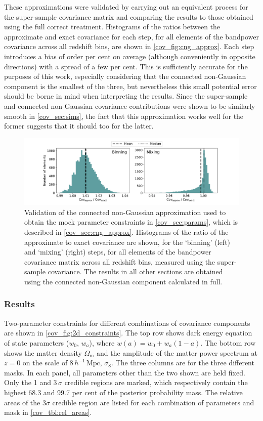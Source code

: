 These approximations were validated by carrying out an equivalent process for the super-sample covariance matrix and comparing the results to those obtained using the full correct treatment.
Histograms of the ratios between the approximate and exact covariance for each step, for all elements of the bandpower covariance across all redshift bins, are shown in \autoref{cov_fig:cng_approx}.
Each step introduces a bias of order per cent on average (although conveniently in opposite directions) with a spread of a few per cent.
This is sufficiently accurate for the purposes of this work, especially considering that the connected non-Gaussian component is the smallest of the three, but nevertheless this small potential error should be borne in mind when interpreting the results. Since the super-sample and connected non-Gaussian covariance contributions were shown to be similarly smooth in \autoref{cov_sec:sims}, the fact that this approximation works well for the former suggests that it should too for the latter.

\begin{figure}
\includegraphics[width=\textwidth]{cng_approx}
\caption{Validation of the connected non-Gaussian approximation used to obtain the mock parameter constraints in \autoref{cov_sec:params}, which is described in \autoref{cov_sec:cng_approx}. Histograms of the ratio of the approximate to exact covariance are shown, for the `binning' (left) and `mixing' (right) steps, for all elements of the bandpower covariance matrix across all redshift bins, measured using the super-sample covariance. The results in all other sections are obtained using the connected non-Gaussian component calculated in full.}
\label{cov_fig:cng_approx}
\end{figure}

\subsubsection{Results}

Two-parameter constraints for different combinations of covariance components are shown in \autoref{cov_fig:2d_constraints}.
The top row shows dark energy equation of state parameters ($w_0$, $w_a$), where $w \left( a \right) = w_0 + w_a \left( 1 - a \right)$.
The bottom row shows the matter density $\Omega_\text{m}$ and the amplitude of the matter power spectrum at $z = 0$ on the scale of $8\,h^{-1}\,\text{Mpc}$, $\sigma_8$.
The three columns are for the three different masks. In each panel, all parameters other than the two shown are held fixed. Only the 1 and 3\,$\sigma$ credible regions are marked, which respectively contain the highest 68.3 and 99.7 per cent of the posterior probability mass. The relative areas of the $3\sigma$ credible region are listed for each combination of parameters and mask in \autoref{cov_tbl:rel_areas}.

